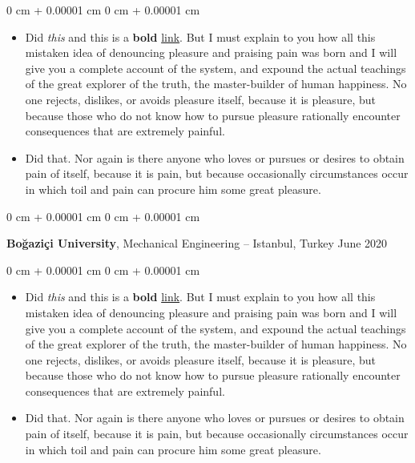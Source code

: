 \documentclass[10pt, letterpaper]{article}
\newenvironment{highlights}{
    \begin{itemize}[
        topsep=0.10 cm,
        parsep=0.10 cm,
        partopsep=0pt,
        itemsep=0pt,
        leftmargin=0 cm + 10pt
    ]
}{
    \end{itemize}
} %
\newenvironment{onecolentry}{
    \begin{adjustwidth}{
        0 cm + 0.00001 cm
    }{
        0 cm + 0.00001 cm
    }
}{
    \end{adjustwidth}
} %
\newenvironment{twocolentry}[2][]{
    \onecolentry
    \def\secondColumn{#2}
    \setcolumnwidth{\fill, 4.5 cm}
    \begin{paracol}{2}
}{
    \switchcolumn \raggedleft \secondColumn
    \end{paracol}
    \endonecolentry
} %
\begin{document}
        \vspace{0.10 cm}
        \begin{onecolentry}
            \begin{highlights}
                \item Did \textit{this} and this is a \textbf{bold} \href{https://example.com}{link}. But I must explain to you how all this mistaken idea of denouncing pleasure and praising pain was born and I will give you a complete account of the system, and expound the actual teachings of the great explorer of the truth, the master-builder of human happiness. No one rejects, dislikes, or avoids pleasure itself, because it is pleasure, but because those who do not know how to pursue pleasure rationally encounter consequences that are extremely painful.
                \item Did that. Nor again is there anyone who loves or pursues or desires to obtain pain of itself, because it is pain, but because occasionally circumstances occur in which toil and pain can procure him some great pleasure.
            \end{highlights}
        \end{onecolentry}


        \vspace{0.2 cm}

        \begin{twocolentry}{
            June 2020
        }
            \textbf{Boğaziçi University}, Mechanical Engineering -- Istanbul, Turkey\end{twocolentry}

        \vspace{0.10 cm}
        \begin{onecolentry}
            \begin{highlights}
                \item Did \textit{this} and this is a \textbf{bold} \href{https://example.com}{link}. But I must explain to you how all this mistaken idea of denouncing pleasure and praising pain was born and I will give you a complete account of the system, and expound the actual teachings of the great explorer of the truth, the master-builder of human happiness. No one rejects, dislikes, or avoids pleasure itself, because it is pleasure, but because those who do not know how to pursue pleasure rationally encounter consequences that are extremely painful.
                \item Did that. Nor again is there anyone who loves or pursues or desires to obtain pain of itself, because it is pain, but because occasionally circumstances occur in which toil and pain can procure him some great pleasure.
            \end{highlights}
        \end{onecolentry}
\end{document}
